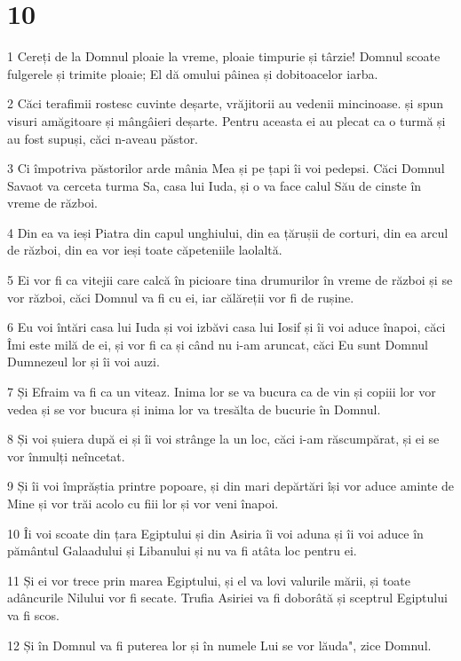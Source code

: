 \chapter{10}

\par 1 Cereți de la Domnul ploaie la vreme, ploaie timpurie și târzie! Domnul scoate fulgerele și trimite ploaie; El dă omului pâinea și dobitoacelor iarba.
\par 2 Căci terafimii rostesc cuvinte deșarte, vrăjitorii au vedenii mincinoase. și spun visuri amăgitoare și mângâieri deșarte. Pentru aceasta ei au plecat ca o turmă și au fost supuși, căci n-aveau păstor.
\par 3 Ci împotriva păstorilor arde mânia Mea și pe țapi îi voi pedepsi. Căci Domnul Savaot va cerceta turma Sa, casa lui Iuda, și o va face calul Său de cinste în vreme de război.
\par 4 Din ea va ieși Piatra din capul unghiului, din ea țărușii de corturi, din ea arcul de război, din ea vor ieși toate căpeteniile laolaltă.
\par 5 Ei vor fi ca vitejii care calcă în picioare tina drumurilor în vreme de război și se vor război, căci Domnul va fi cu ei, iar călăreții vor fi de rușine.
\par 6 Eu voi întări casa lui Iuda și voi izbăvi casa lui Iosif și îi voi aduce înapoi, căci Îmi este milă de ei, și vor fi ca și când nu i-am aruncat, căci Eu sunt Domnul Dumnezeul lor și îi voi auzi.
\par 7 Și Efraim va fi ca un viteaz. Inima lor se va bucura ca de vin și copiii lor vor vedea și se vor bucura și inima lor va tresălta de bucurie în Domnul.
\par 8 Și voi șuiera după ei și îi voi strânge la un loc, căci i-am răscumpărat, și ei se vor înmulți neîncetat.
\par 9 Și îi voi împrăștia printre popoare, și din mari depărtări își vor aduce aminte de Mine și vor trăi acolo cu fiii lor și vor veni înapoi.
\par 10 Îi voi scoate din țara Egiptului și din Asiria îi voi aduna și îi voi aduce în pământul Galaadului și Libanului și nu va fi atâta loc pentru ei.
\par 11 Și ei vor trece prin marea Egiptului, și el va lovi valurile mării, și toate adâncurile Nilului vor fi secate. Trufia Asiriei va fi doborâtă și sceptrul Egiptului va fi scos.
\par 12 Și în Domnul va fi puterea lor și în numele Lui se vor lăuda", zice Domnul.

